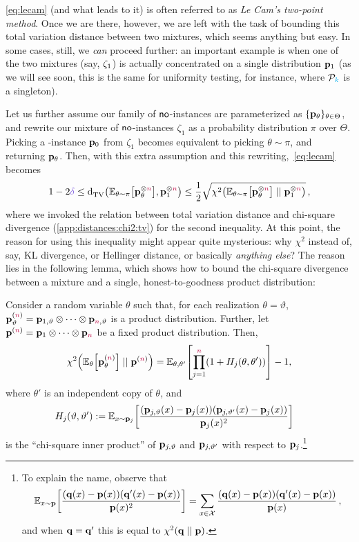 \cref{eq:lecam} (and what leads to it) is often referred to as \emph{Le Cam's two-point method}. Once we are there, however, we are left with the task of bounding this total variation distance between two mixtures, which seems anything but easy. In some cases, still, we \emph{can} proceed further: an important example is when one of the two mixtures (say, $\zeta_1$) is actually concentrated on a single distribution $\mathbf{p}_1$ (as we will see soon, this is the same for uniformity testing, for instance, where $\mathcal{P}_{\textcolor{cyan}{k}}$ is a singleton). 

Let us further assume our family of ${\sf{}no}$-instances are parameterized as $\{\mathbf{p}_\theta\}_{\theta\in\Theta}$, and rewrite our mixture of ${\sf{}no}$-instances $\zeta_1$ as a probability distribution $\pi$ over $\Theta$. Picking a \no-instance $\mathbf{p}_0$ from $\zeta_1$ becomes equivalent to picking $\theta\sim\pi$, and returning $\mathbf{p}_\theta$. Then, with this extra assumption and this rewriting,~\cref{eq:lecam} becomes
\begin{equation}
	\label{eq:lecam:simpler}
	1-2\errprob \leq \totalvardist{\bE{\theta\sim\pi}{\p_\theta^{\otimes\ns}}}{\p_\accept^{\otimes\ns}}
	\leq \frac{1}{2}\sqrt{\chisquare{\bE{\theta\sim\pi}{\p_\theta^{\otimes\ns}}}{\p_\accept^{\otimes\ns}}}\,,
\end{equation}
where we invoked the relation between total variation distance and chi-square divergence (\cref{app:distances:chi2:tv}) for the second inequality. At this point, the reason for using this inequality might appear quite mysterious: why $\chi^2$ instead of, say, KL divergence, or Hellinger distance, or basically \emph{anything else}? The reason lies in the following lemma, which shows how to bound the chi-square divergence between a mixture and a single, honest-to-goodness product distribution:
\begin{lemma}
	\label{lemma:ingster}
Consider a random variable $\theta$ such that, for each realization
$\theta=\vartheta$, $\mathbf{p}_\vartheta^{({\textcolor{purple}{n}})}=\mathbf{p}_{1,\vartheta} \otimes \dots \otimes \mathbf{p}_{{\textcolor{purple}{n}},\vartheta}$ is a product distribution. Further, let
$\mathbf{p}^{({\textcolor{purple}{n}})} = \mathbf{p}_1 \otimes \dots \otimes \mathbf{p}_{\textcolor{purple}{n}}$ be a fixed product
distribution. Then,
\[
\chisquare{\bE{\theta}{\p_\theta^{(\ns)}} }{ \p^{(\ns)} } = \bE{\theta,\theta'}{\prod_{j=1}^\ns (1+{H_j(\theta,\theta')})} - 1,
\]
where $\theta'$ is an independent copy of $\theta$, and
\begin{align*}
H_{j}(\vartheta,\vartheta') &\eqdef \bE{x\sim\p_j}{\frac{(\p_{j,\vartheta}(x)-\p_j(x))(\p_{j,\vartheta'}(x)-\p_j(x))}{\p_j(x)^2}}%
\end{align*}
is the ``chi-square inner product'' of $\mathbf{p}_{j,\vartheta}$ and $\mathbf{p}_{j,\vartheta'}$ with respect to $\mathbf{p}_j$.\footnote{To explain the name, observe that
\[
\bE{x\sim\p}{\frac{(\q(x)-\p(x))(\q'(x)-\p(x))}{\p(x)^2}}=\sum_{x\in\domain} \frac{(\q(x)-\p(x))(\q'(x)-\p(x))}{\p(x)}\,,
\] and when $\mathbf{q}=\mathbf{q}'$ this is equal to $\chisquare{\q}{\p}$.}
\end{lemma}
